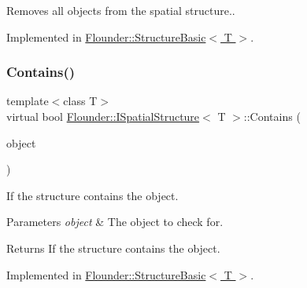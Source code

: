 Removes all objects from the spatial structure.. 



Implemented in \hyperlink{class_flounder_1_1_structure_basic_ae5ca6b77a74f2277ea27d1d6b9e4ad64}{Flounder\+::\+Structure\+Basic$<$ T $>$}.

\mbox{\label{class_flounder_1_1_i_spatial_structure_ae054d2ec399867ef48f33e693659f6cd}} 
\subsubsection{\texorpdfstring{Contains()}{Contains()}}
{\footnotesize\ttfamily template$<$class T$>$ \\
virtual bool \hyperlink{class_flounder_1_1_i_spatial_structure}{Flounder\+::\+I\+Spatial\+Structure}$<$ T $>$\+::Contains (\begin{DoxyParamCaption}\item[{\hyperlink{class_flounder_1_1_i_spatial_object}{I\+Spatial\+Object} $\ast$}]{object }\end{DoxyParamCaption})\hspace{0.3cm}{\ttfamily [pure virtual]}}



If the structure contains the object. 


\begin{DoxyParams}{Parameters}
{\em object} & The object to check for. \\
\hline
\end{DoxyParams}
\begin{DoxyReturn}{Returns}
If the structure contains the object. 
\end{DoxyReturn}


Implemented in \hyperlink{class_flounder_1_1_structure_basic_ab49e0b2fa705150cb4a0f1eb95a8d096}{Flounder\+::\+Structure\+Basic$<$ T $>$}.

\mbox{\label{class_flounder_1_1_i_spatial_structure_a533a5190b622a2ee4e36d28a59d9b12f}} 
